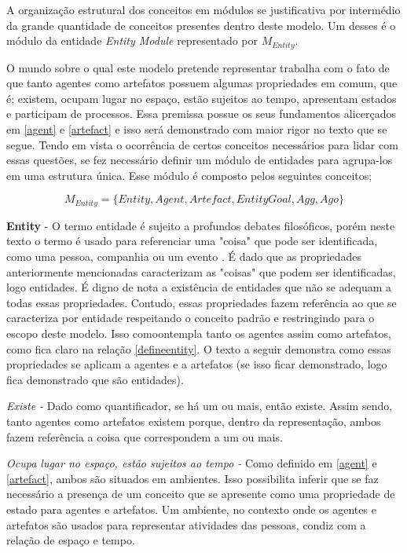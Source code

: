 A organização estrutural dos conceitos em módulos se justificativa por intermédio da grande quantidade de conceitos presentes dentro deste modelo. Um desses é o módulo da entidade \textit{Entity Module} representado por $M_{Entity}$. 

O mundo sobre o qual este modelo pretende representar trabalha com o fato de que tanto agentes como artefatos possuem algumas propriedades em comum, que é; existem, ocupam lugar no espaço, estão sujeitos ao tempo, apresentam estados e participam de processos. Essa premissa possue os seus fundamentos alicerçados em \ref{agent} e \ref{artefact} e isso será demonstrado com maior rigor no texto que se segue. Tendo em vista o ocorrência de certos conceitos necessários para lidar com essas questões, se fez necessário definir um módulo de entidades para agrupa-los em uma estrutura única. Esse módulo é composto pelos seguintes conceitos;

\begin{equation} 
M_{Entity} = \{ Entity, Agent, Artefact, EntityGoal, Agg, Ago\}
\end{equation}\label{modent}

\textbf{Entity} - O termo entidade é sujeito a profundos debates filosóficos, porém neste texto o termo é usado para referenciar uma "coisa" que pode ser identificada, como uma pessoa, companhia ou um evento \cite{entity}. É dado que as propriedades anteriormente mencionadas caracterizam as "coisas" que podem ser identificadas, logo entidades. É digno de nota a existência de entidades que não se adequam a todas essas propriedades. Contudo, essas propriedades fazem referência ao que se caracteriza por entidade respeitando o conceito padrão \cite{entity} e restringindo para o escopo deste modelo. Isso comoontempla tanto os agentes assim como artefatos, como fica claro na relação \ref{defineentity}. O texto a seguir demonstra como essas propriedades se aplicam a agentes e a artefatos (se isso ficar demonstrado, logo fica demonstrado que são entidades).

\textit{Existe -} Dado como quantificador, se há um ou mais, então existe. Assim sendo, tanto agentes como artefatos existem porque, dentro da representação, ambos fazem referência a coisa que correspondem a um ou mais. 

\textit{Ocupa lugar no espaço, estão sujeitos ao tempo - } Como definido em \ref{agent} e \ref{artefact}, ambos são situados em ambientes. 
Isso possibilita inferir que se faz necessário a presença de um conceito que se apresente como uma propriedade de estado para agentes e artefatos. Um ambiente, no contexto onde os agentes e artefatos são usados para representar atividades das pessoas, condiz com a relação de espaço e tempo. 

